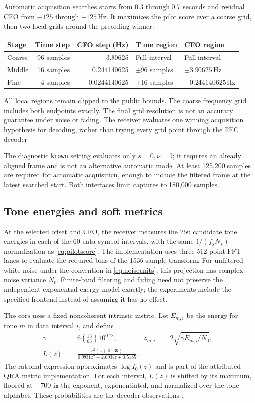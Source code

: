 \documentclass[11pt,a4paper]{article}
\newcommand{\Hz}{\,\mathrm{Hz}}
\newcommand{\Nzero}{\widehat{N}_0}
\begin{document}
Automatic acquisition searches starts from 0.3 through 0.7 seconds and
residual CFO from $-125$ through $+125\Hz$. It maximizes the pilot score
over a coarse grid, then two local grids around the preceding winner:
\begin{center}
\begin{tabular}{@{}lrrll@{}}
\toprule
Stage & Time step & CFO step (Hz) & Time region & CFO region \\
\midrule
Coarse & 96 samples & 3.90625 & Full interval & Full interval \\
Middle & 16 samples & 0.244140625 & $\pm96$ samples & $\pm3.90625\Hz$ \\
Fine & 4 samples & 0.0244140625 & $\pm16$ samples & $\pm0.244140625\Hz$ \\
\bottomrule
\end{tabular}
\end{center}
All local regions remain clipped to the public bounds. The coarse frequency
grid includes both endpoints exactly. The final grid resolution is not an
accuracy guarantee under noise or fading. The receiver evaluates one winning
acquisition hypothesis for decoding, rather than trying every grid point
through the FEC decoder.

The diagnostic \texttt{known} setting evaluates only $s=0,\nu=0$; it
requires an already aligned frame and is not an alternative automatic mode.
At least 125,200 samples are required for automatic acquisition, enough
to include the filtered frame at the latest searched start. Both interfaces
limit captures to 180,000 samples.

\subsection{Tone energies and soft metrics}

At the selected offset and CFO, the receiver measures the 256 candidate
tone energies in each of the 60 data-symbol intervals, with the same
$1/(f_sN_s)$ normalization as \eqref{eq:pilotscore}. The implementation uses
three 512-point FFT lanes to evaluate the required bins of the
1536-sample transform. For unfiltered white noise under the convention in
\eqref{eq:noiseunits}, this projection has complex noise variance $N_0$.
Finite-band filtering and fading need not preserve the independent
exponential-energy model exactly; the experiments include the specified
frontend instead of assuming it has no effect.

The core uses a fixed noncoherent intrinsic metric. Let $E_{m,i}$ be the energy for
tone $m$ in data interval $i$, and define
\begin{align}
  \gamma &= 6\left(\frac{13}{63}\right)10^{0.28}, &
  z_{m,i} &= 2\sqrt{\gamma E_{m,i}/\Nzero}, \label{eq:metricarg}\\
  L(z) &= \frac{z^2(z+0.039)}{0.9931z^2+2.6936z+0.5185}. \label{eq:metric}
\end{align}
The rational expression approximates $\log I_0(z)$ and is part of the
attributed QRA metric implementation. For each interval, $L(z)$ is shifted
by its maximum, floored at $-700$ in the exponent, exponentiated, and
normalized over the tone alphabet. These probabilities are the decoder
observations \cite{coding,provenance}.
\end{document}

